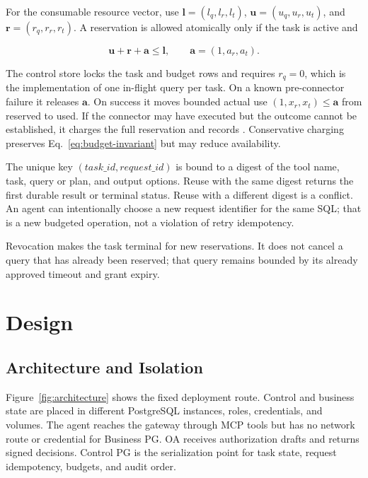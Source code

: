 \documentclass[10pt,journal,compsoc]{IEEEtran}
\newcommand{\code}[1]{\texttt{\detokenize{#1}}}
\newcommand{\vect}[1]{\boldsymbol{#1}}
\begin{document}
For the consumable resource vector, use
$\vect{l}=(l_q,l_r,l_t)$, $\vect{u}=(u_q,u_r,u_t)$, and
$\vect{r}=(r_q,r_r,r_t)$.  A reservation is allowed atomically only if the task
is active and

\begin{equation}
  \vect{u}+\vect{r}+\vect{a}\leq\vect{l},
  \qquad \vect{a}=(1,a_r,a_t).
  \label{eq:reserve}
\end{equation}

The control store locks the task and budget rows and requires $r_q=0$, which is
the implementation of one in-flight query per task.  On a known pre-connector
failure it releases $\vect{a}$.  On success it moves bounded actual use
$(1,x_r,x_t)\leq\vect{a}$ from reserved to used.  If the connector may have
executed but the outcome cannot be established, it charges the full reservation
and records \code{INDETERMINATE}.  Conservative charging preserves
Eq.~\eqref{eq:budget-invariant} but may reduce availability.

The unique key $(task\_id,request\_id)$ is bound to a digest of the tool name,
task, query or plan, and output options.  Reuse with the same digest returns the
first durable result or terminal status.  Reuse with a different digest is a
conflict.  An agent can intentionally choose a new request identifier for the
same SQL; that is a new budgeted operation, not a violation of retry
idempotency.

Revocation makes the task terminal for new reservations.  It does not cancel a
query that has already been reserved; that query remains bounded by its already
approved timeout and grant expiry.

\section{Design}
\label{sec:design}

\subsection{Architecture and Isolation}

Figure~\ref{fig:architecture} shows the fixed deployment route.  Control and
business state are placed in different PostgreSQL instances, roles, credentials,
and volumes.  The agent reaches the gateway through MCP tools but has no network
route or credential for Business PG.  OA receives authorization drafts and
returns signed decisions.  Control PG is the serialization point for task state,
request idempotency, budgets, and audit order.
\end{document}
